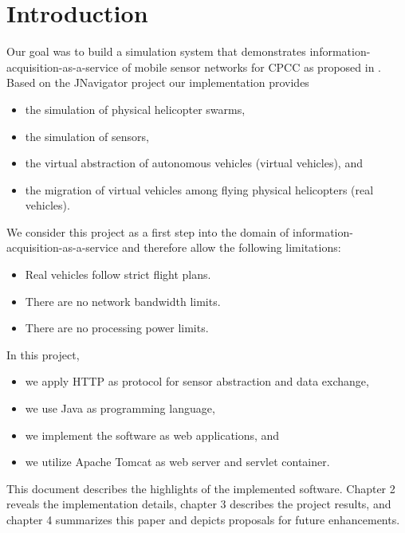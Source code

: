 
\chapter{Introduction}

Our goal was to build a simulation system that demonstrates information-acquisition-as-a-service
of mobile sensor networks for \ac{CPCC} as proposed in \cite{HotCloud10}.
Based on the JNavigator project \cite{CKrainer2009} our implementation provides
\begin{itemize}
	\item the simulation of physical helicopter swarms,
	\item the simulation of sensors,
	\item the virtual abstraction of autonomous vehicles (virtual vehicles), and
	\item the migration of virtual vehicles among flying physical helicopters (real vehicles).
\end{itemize} 

We consider this project as a first step into the domain of information-acquisition-as-a-service
and therefore allow the following limitations:
\begin{itemize}
	\item Real vehicles follow strict flight plans.
	\item There are no network bandwidth limits.
	\item There are no processing power limits.
\end{itemize} 


In this project,
\begin{itemize}
	\item we apply \acs{HTTP} \cite{RFC_2616} as protocol for sensor abstraction and data exchange,
	\item we use Java as programming language,
	\item we implement the software as web applications, and
	\item we utilize Apache Tomcat \cite{TOMCAT2012} as web server and servlet container.
\end{itemize} 

This document describes the highlights of the implemented software.
Chapter 2 reveals the implementation details,
chapter 3 describes the project results,
and chapter 4 summarizes this paper and depicts proposals for future enhancements.
